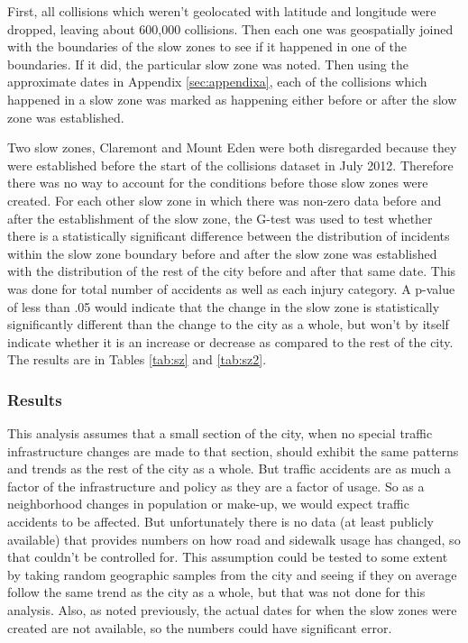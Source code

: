 \documentclass[10pt,journal,compsoc]{IEEEtran}
\begin{document}
First, all collisions which weren't geolocated with latitude and longitude were dropped, leaving about 600,000 collisions.  Then each one was geospatially joined with the boundaries of the slow zones to see if it happened in one of the boundaries.  If it did, the particular slow zone  was noted.  Then using the approximate dates in Appendix \ref{sec:appendixa}, each of the collisions which happened in a slow zone  was marked as happening either before or after the slow zone  was established.

Two slow zones, Claremont and Mount Eden were both disregarded because they were established before the start of the collisions dataset in July 2012.  Therefore there was no way to account for the conditions before those slow zones were created.  For each other slow zone in which there was non-zero data before and after the establishment of the slow zone, the G-test was used to test whether there is a statistically significant difference between the distribution of incidents within the slow zone boundary before and after the slow zone was established with the distribution of the rest of the city before and after that same date.  This was done for total number of accidents as well as each injury category.  A p-value of less than .05 would indicate that the change in the slow zone is statistically significantly different than the change to the city as a whole, but won't by itself indicate whether it is an increase or decrease as compared to the rest of the city.  The results are in Tables \ref{tab:sz} and \ref{tab:sz2}.

\subsubsection{Results}


This analysis assumes that a small section of the city, when no special traffic infrastructure changes are made to that section, should exhibit the same patterns and trends as the rest of the city as a whole.  But traffic accidents are as much a factor of the infrastructure and policy as they are a factor of usage.  So as a neighborhood changes in population or make-up, we would expect traffic accidents to be affected.  But unfortunately there is no data (at least publicly available) that provides numbers on how road and sidewalk usage has changed, so that couldn't be controlled for.  This assumption could be tested to some extent by taking random geographic samples from the city and seeing if they on average follow the same trend as the city as a whole, but that was not done for this analysis.  Also, as noted previously, the actual dates for when the slow zones were created are not available, so the numbers could have significant error.
\end{document}
